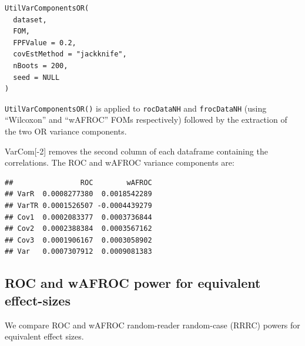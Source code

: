 \documentclass[
]{book}
\newenvironment{Shaded}{\begin{snugshade}}{\end{snugshade}}
\newcommand{\AttributeTok}[1]{\textcolor[rgb]{0.77,0.63,0.00}{#1}}
\newcommand{\DecValTok}[1]{\textcolor[rgb]{0.00,0.00,0.81}{#1}}
\newcommand{\FunctionTok}[1]{\textcolor[rgb]{0.00,0.00,0.00}{#1}}
\newcommand{\NormalTok}[1]{#1}
\newcommand{\OtherTok}[1]{\textcolor[rgb]{0.56,0.35,0.01}{#1}}
\newcommand{\SpecialCharTok}[1]{\textcolor[rgb]{0.00,0.00,0.00}{#1}}
\newcommand{\StringTok}[1]{\textcolor[rgb]{0.31,0.60,0.02}{#1}}
\begin{document}
\begin{verbatim}
UtilVarComponentsOR(
  dataset,
  FOM,
  FPFValue = 0.2,
  covEstMethod = "jackknife",
  nBoots = 200,
  seed = NULL
)
\end{verbatim}

\texttt{UtilVarComponentsOR()} is applied to \texttt{rocDataNH} and \texttt{frocDataNH} (using ``Wilcoxon'' and ``wAFROC'' FOMs respectively) followed by the extraction of the two OR variance components.

\begin{Shaded}
\end{Shaded}

VarCom{[}-2{]} removes the second column of each dataframe containing the correlations. The ROC and wAFROC variance components are:

\begin{verbatim}
##                ROC        wAFROC
## VarR  0.0008277380  0.0018542289
## VarTR 0.0001526507 -0.0004439279
## Cov1  0.0002083377  0.0003736844
## Cov2  0.0002388384  0.0003567162
## Cov3  0.0001906167  0.0003058902
## Var   0.0007307912  0.0009081383
\end{verbatim}

\hypertarget{roc-and-wafroc-power-for-equivalent-effect-sizes}{%
\subsection{ROC and wAFROC power for equivalent effect-sizes}\label{roc-and-wafroc-power-for-equivalent-effect-sizes}}

We compare ROC and wAFROC random-reader random-case (RRRC) powers for equivalent effect sizes.
\end{document}
